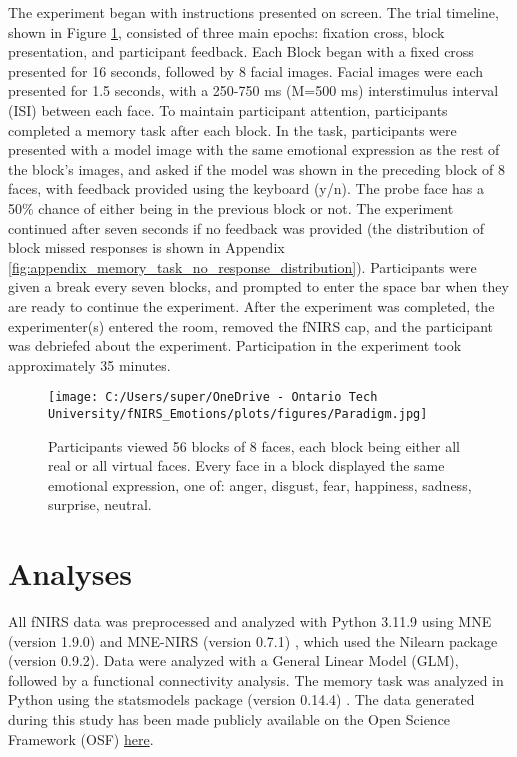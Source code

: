 The experiment began with instructions presented on screen. 
The trial timeline, shown in Figure \ref{fig:paradigm}, consisted of three main epochs: fixation cross, block presentation, and participant feedback. 
Each Block began with a fixed cross presented for 16 seconds, followed by 8 facial images. 
Facial images were each presented for 1.5 seconds, with a 250-750 ms (M=500 ms) interstimulus interval (ISI) between each face. 
To maintain participant attention, participants completed a memory task after each block. 
In the task, participants were presented with a model image with the same emotional expression as the rest of the block's images, and asked if the model was shown in the preceding block of 8 faces, with feedback provided using the keyboard (y/n). 
The probe face has a 50\% chance of either being in the previous block or not. 
The experiment continued after seven seconds if no feedback was provided (the distribution of block missed responses is shown in Appendix \ref{fig:appendix_memory_task_no_response_distribution}).
Participants were given a break every seven blocks, and prompted to enter the space bar when they are ready to continue the experiment. 
After the experiment was completed, the experimenter(s) entered the room, removed the fNIRS cap, and the participant was debriefed about the experiment. 
Participation in the experiment took approximately 35 minutes.

\begin{figure}[H]
    \centering
    \texttt{[image: C:/Users/super/OneDrive - Ontario Tech University/fNIRS\_Emotions/plots/figures/Paradigm.jpg]}
    \caption[Experimental paradigm overview]{Participants viewed 56 blocks of 8 faces, each block being either all real or all virtual faces.
    Every face in a block displayed the same emotional expression, one of: anger, disgust, fear, happiness, sadness, surprise, neutral. }
    \label{fig:paradigm}
\end{figure}

\section{Analyses}
All fNIRS data was preprocessed and analyzed with Python 3.11.9 using MNE (version 1.9.0) \citep{gramfort_meg_2013} and MNE-NIRS (version 0.7.1) \citep{luke_analysis_2021}, which used the Nilearn package (version 0.9.2). 
Data were analyzed with a General Linear Model (GLM), followed by a functional connectivity analysis.
The memory task was analyzed in Python using the statsmodels package (version 0.14.4) \citep{seabold2010statsmodels}. 
The data generated during this study has been made publicly available on the Open Science Framework (OSF) \href{https://osf.io/d7bzp/?view_only=f5a96f051edb4e768c5e4461699ef1ce}{here}. 

